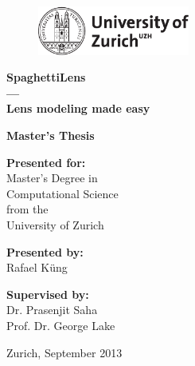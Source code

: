 \begin{figure}[th]
		\includegraphics[width=5cm]{pic/uzh}
	\label{fig:logo}
\end{figure}

\begin{center}

\vspace{0.5cm}


{\Huge\bf SpaghettiLens\\}
\vspace{0.5cm}
{\Huge\bf ---\\}
\vspace{0.5cm}
{\Huge\bf Lens modeling made easy}

\vspace{2cm}

{\Large\bf Master's Thesis}

\vspace{1cm}

{\Large\bf Presented for:\\}
{\Large Master's Degree in\\}
{\Large Computational Science\\}
{\Large from the\\}
{\Large University of Zurich\\}

\vspace{1cm}

{\Large\bf Presented by:\\}
{\Large Rafael K\"ung\\}

\vspace{1cm}

{\Large\bf Supervised by:\\}
{\Large Dr. Prasenjit Saha\\}
{\Large Prof. Dr. George Lake\\}


\vspace{1cm}

{\Large Zurich, September 2013} 

\end{center}
\newpage